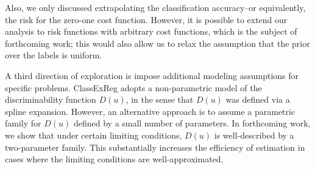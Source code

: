 \documentclass[twoside,11pt]{article}
\begin{document}

Also, we only discussed extrapolating the
classification accuracy--or equivalently, the risk for the zero-one
cost function.  However, it is possible to extend our analysis to risk
functions with arbitrary cost functions, which is the subject of
forthcoming work; this would also allow us to relax the assumption that the prior over the labels is uniform. %


A third direction of exploration is impose additional modeling assumptions for specific problems.  ClassExReg adopts a non-parametric model of the discriminability function $D(u)$, in the sense that $D(u)$ was defined via a spline expansion.   However, an alternative approach is to assume a parametric family for $D(u)$ defined by a small number of parameters.  In forthcoming work, we show that under certain limiting conditions, $D(u)$ is well-described by a two-parameter family.  This substantially increases the efficiency of estimation in cases where the limiting conditions are well-approximated.






\end{document}
